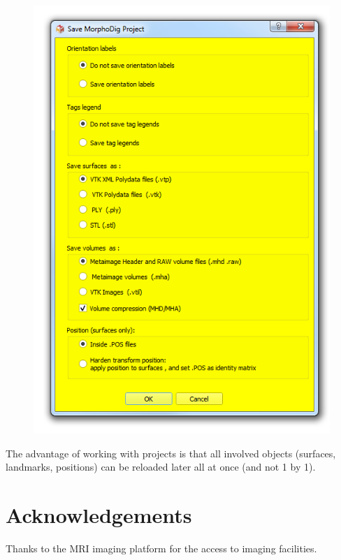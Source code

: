 \documentclass[12pt, a4paper]{book}
\begin{document}
\begin{figure}
  \centering  
 \includegraphics[scale=0.5]{../images/07/project/save_ntw.png}
\label{save_project_file}
\end{figure}

The advantage of working with projects is that all involved objects (surfaces, landmarks, positions) can be reloaded later all at once (and not 1 by 1). 

\section{Acknowledgements}
Thanks to the MRI imaging platform for the access to imaging facilities.



%  		
\end{document}
